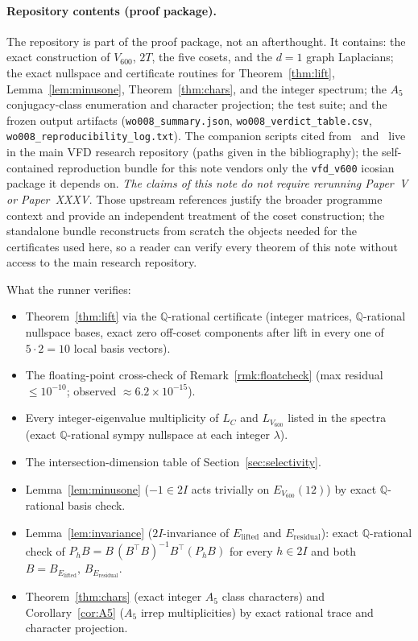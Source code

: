 \documentclass[11pt]{article}
\newcommand{\Vsix}{V_{600}}
\newcommand{\Lsix}{L_{\Vsix}}
\newcommand{\Loc}{L_{C}}
\newcommand{\Esix}{E_{\Vsix}}
\newcommand{\Elift}{E_{\mathrm{lifted}}}
\newcommand{\Eres}{E_{\mathrm{residual}}}
\newcommand{\twoI}{2I}
\newcommand{\twoT}{2T}
\theoremstyle{plain}
\theoremstyle{definition}
\begin{document}
\paragraph{Repository contents (proof package).}
The repository is part of the proof package, not an afterthought.  It
contains: the exact construction of $\Vsix$, $\twoT$, the five
cosets, and the $d{=}1$ graph Laplacians; the exact nullspace and
certificate routines for Theorem~\ref{thm:lift},
Lemma~\ref{lem:minusone}, Theorem~\ref{thm:chars}, and the integer
spectrum; the $A_5$ conjugacy-class enumeration and character
projection; the test suite; and the frozen output artifacts
(\texttt{wo008\_summary.json}, \texttt{wo008\_verdict\_table.csv},
\texttt{wo008\_reproducibility\_log.txt}).  The companion scripts cited from~\cite{SmartV} and~\cite{SmartXXXV}
live in the main VFD research repository (paths given in the
bibliography); the self-contained reproduction bundle for this note
vendors only the \texttt{vfd\_v600} icosian package it depends on.
\emph{The claims of this note do not require rerunning Paper~V or
Paper~XXXV.}  Those upstream references justify the broader
programme context and provide an independent treatment of the coset
construction; the standalone bundle reconstructs from scratch the
objects needed for the certificates used here, so a reader can
verify every theorem of this note without access to the main
research repository.

\medskip
\noindent What the runner verifies:
\begin{itemize}
  \item Theorem~\ref{thm:lift} via the $\mathbb{Q}$-rational
        certificate (integer matrices, $\mathbb{Q}$-rational nullspace
        bases, exact zero off-coset components after lift in every one
        of $5\cdot 2 = 10$ local basis vectors).
  \item The floating-point cross-check of
        Remark~\ref{rmk:floatcheck} (max residual
        $\le 10^{-10}$; observed $\approx 6.2\times 10^{-15}$).
  \item Every integer-eigenvalue multiplicity of $\Loc$ and $\Lsix$
        listed in the spectra (exact $\mathbb{Q}$-rational sympy
        nullspace at each integer $\lambda$).
  \item The intersection-dimension table of
        Section~\ref{sec:selectivity}.
  \item Lemma~\ref{lem:minusone} ($-1\in\twoI$ acts trivially on
        $\Esix(12)$) by exact $\mathbb{Q}$-rational basis check.
  \item Lemma~\ref{lem:invariance} ($\twoI$-invariance of $\Elift$
        and $\Eres$): exact $\mathbb{Q}$-rational check of
        $P_h B = B\,(B^\top B)^{-1} B^\top(P_h B)$ for every
        $h\in\twoI$ and both $B=B_{\Elift},\,B_{\Eres}$.
  \item Theorem~\ref{thm:chars} (exact integer $A_5$ class
        characters) and Corollary~\ref{cor:A5} ($A_5$ irrep
        multiplicities) by exact rational trace and character
        projection.
\end{itemize}
\end{document}
